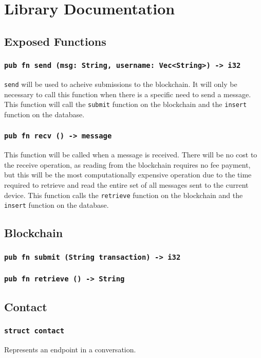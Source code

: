 \documentclass[]{article}
\begin{document}
\section{Library Documentation}
\subsection{Exposed Functions}
\subsubsection{\texttt{pub fn send (msg: String, username: Vec<String>) -> i32}}
\texttt{send} will be used to acheive submissions to the blockchain. It will only be necessary to call this function when there is a specific need to send a message. This function will call the \texttt{submit} function on the blockchain and the \texttt{insert} function on the database.
\subsubsection{\texttt{pub fn recv () -> message}}
This function will be called when a message is received. There will be no cost to the receive operation, as reading from the blockchain requires no fee payment, but this will be the most computationally expensive operation due to the time required to retrieve and read the entire set of all messages sent to the current device. This function calls the \texttt{retrieve} function on the blockchain and the \texttt{insert} function on the database.
\subsection{Blockchain}
\subsubsection{\texttt{pub fn submit (String transaction) -> i32}}
\subsubsection{\texttt{pub fn retrieve () -> String}}
\subsection{Contact}
\subsubsection{\texttt{struct contact}}
Represents an endpoint in a conversation.
\end{document}
